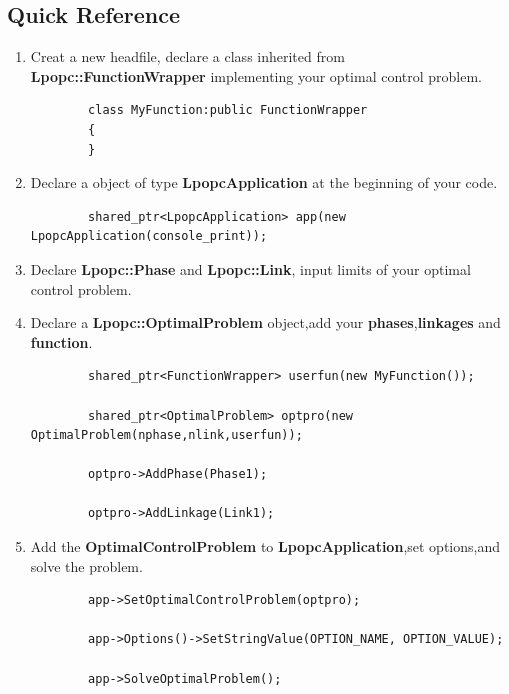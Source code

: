 \documentclass[10pt]{article}
\begin{document}
    \subsection{Quick Reference}
     \begin{enumerate}
     	\item Creat a new headfile, declare a class inherited from \textbf{Lpopc::FunctionWrapper} implementing your optimal control problem.
     	\begin{lstlisting}
     	class MyFunction:public FunctionWrapper
        {
        }
     	\end{lstlisting}
     	\item Declare a object of type \textbf{LpopcApplication} at the beginning of your code.
     	\begin{lstlisting}
     	shared_ptr<LpopcApplication> app(new LpopcApplication(console_print));
     	\end{lstlisting}
     	\item Declare  \textbf{Lpopc::Phase} and \textbf{Lpopc::Link}, input limits of your optimal control problem.
     	\item Declare a \textbf{Lpopc::OptimalProblem} object,add your \textbf{phases},\textbf{linkages} and \textbf{function}.
     	\begin{lstlisting}
     	shared_ptr<FunctionWrapper> userfun(new MyFunction());
     	
     	shared_ptr<OptimalProblem> optpro(new OptimalProblem(nphase,nlink,userfun));
     	
     	optpro->AddPhase(Phase1);
     	
     	optpro->AddLinkage(Link1);

     	\end{lstlisting}
     	\item Add the \textbf{OptimalControlProblem} to \textbf{LpopcApplication},set options,and solve the problem.
     	\begin{lstlisting}
     	app->SetOptimalControlProblem(optpro);
     	
     	app->Options()->SetStringValue(OPTION_NAME, OPTION_VALUE);
     	
     	app->SolveOptimalProblem();
     	\end{lstlisting}
     \end{enumerate}	
\end{document}
